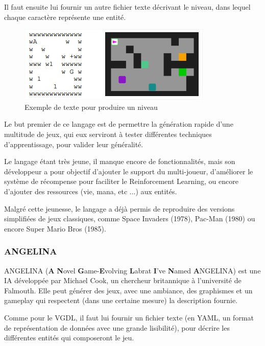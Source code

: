 \documentclass[a4paper, 12pt]{article} %
\begin{document}
\newpage
Il faut ensuite lui fournir un autre fichier texte décrivant le niveau, dans lequel chaque caractère représente une entité.

\begin{figure}[!h]%
	\begin{center} 
		\includegraphics[width=0.60\columnwidth]{images/vgdllevel.jpg}%
		\caption{Exemple de texte pour produire un niveau}%
	\end{center}
\end{figure}

Le but premier de ce langage est de permettre la génération rapide d'une multitude de jeux, qui eux serviront à tester différentes techniques d'apprentissage, pour valider leur généralité.

Le langage étant très jeune, il manque encore de fonctionnalités, mais son développeur a pour objectif d'ajouter le support du multi-joueur, d'améliorer le système de récompense pour faciliter le Reinforcement Learning, ou encore d'ajouter des ressources (vie, mana, etc ...) aux entités.

Malgré cette jeunesse, le langage a déjà permis de reproduire des versions simplifiées de jeux classiques, comme Space Invaders (1978), Pac-Man (1980) ou encore Super Mario Bros (1985). 

\newpage
\subsubsection{ANGELINA}

ANGELINA\cite{cook2014ludus} (\textbf{A} \textbf{N}ovel \textbf{G}ame-\textbf{E}volving \textbf{L}abrat \textbf{I}’ve \textbf{N}amed \textbf{A}NGELINA) est une IA développée par Michael Cook, un chercheur britannique à l’université de Falmouth. Elle peut générer des jeux, avec une ambiance, des graphismes et un gameplay qui respectent (dans une certaine mesure) la description fournie.

Comme pour le VGDL, il faut lui fournir un fichier texte (en YAML, un format de représentation de données avec une grande lisibilité), pour décrire les différentes entités qui composeront le jeu.
\end{document}
